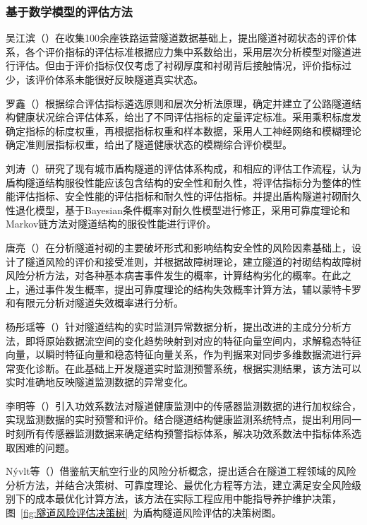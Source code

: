 \subsubsection{基于数学模型的评估方法}

吴江滨（\citeyear{吴江滨2004铁路运营隧道衬砌状态评估体系的建立及工程应用研究}）在收集100余座铁路运营隧道数据基础上，提出隧道衬砌状态的评价体系，各个评价指标的评估标准根据应力集中系数给出，采用层次分析模型对隧道进行评估。但由于评价指标仅仅考虑了衬砌厚度和衬砌背后接触情况，评价指标过少，该评价体系未能很好反映隧道真实状态。

罗鑫（\citeyear{罗鑫2008公路隧道健康状态评估方法及系统研究}）根据综合评估指标遴选原则和层次分析法原理，确定并建立了公路隧道结构健康状况综合评估体系，给出了不同评估指标的定量评定标准。采用乘积标度发确定指标的标度权重，再根据指标权重和样本数据，采用人工神经网络和模糊理论确定准则层指标权重，给出了隧道健康状态的模糊综合评价模型。

刘涛（\citeyear{刘涛2008既有盾构隧道结构性能评价研究}）研究了现有城市盾构隧道的评估体系构成，和相应的评估工作流程，认为盾构隧道结构服役性能应该包含结构的安全性和耐久性，将评估指标分为整体的性能评估指标、安全性能的评估指标和耐久性的评估指标。并提出盾构隧道衬砌耐久性退化模型，基于Bayesian条件概率对耐久性模型进行修正，采用可靠度理论和Markov链方法对隧道结构的服役性能进行评价。

唐亮（\citeyear{唐亮2008隧道病害调查分析及衬砌结构的风险分析与控制研究}）在分析隧道衬砌的主要破坏形式和影响结构安全性的风险因素基础上，设计了隧道风险的评价和接受准则，并根据故障树理论，建立隧道的衬砌结构故障树风险分析方法，对各种基本病害事件发生的概率，计算结构劣化的概率。在此之上，通过事件发生概率，提出可靠度理论的结构失效概率计算方法，辅以蒙特卡罗和有限元分析对隧道失效概率进行分析。

杨彤瑶等（\citeyear{杨彤瑶2013基于改进主元分析方法的隧道应变实时监测预警系统}）针对隧道结构的实时监测异常数据分析，提出改进的主成分分析方法，即将原始数据流空间的变化趋势映射到对应的特征向量空间内，求解稳态特征向量，以瞬时特征向量和稳态特征向量关系，作为判据来对同步多维数据流进行异常变化诊断。在此基础上开发隧道实时监测预警系统，根据实测结果，该方法可以实时准确地反映隧道监测数据的异常变化。

李明等（\citeyear{李明2015基于功效系数法的隧道结构健康监测系统预警研究}）引入功效系数法对隧道健康监测中的传感器监测数据的进行加权综合，实现监测数据的实时预警和评价。结合隧道结构健康监测系统特点，提出利用同一时刻所有传感器监测数据来确定结构预警指标体系，解决功效系数法中指标体系选取困难的问题。

Nývlt等（\citeyear{N2011Probabilistic}）借鉴航天航空行业的风险分析概念，提出适合在隧道工程领域的风险分析方法，并结合决策树、可靠度理论、最优化方程等方法，建立满足安全风险级别下的成本最优化计算方法，该方法在实际工程应用中能指导养护维护决策，图~\ref{fig:隧道风险评估决策树}~为盾构隧道风险评估的决策树图。

